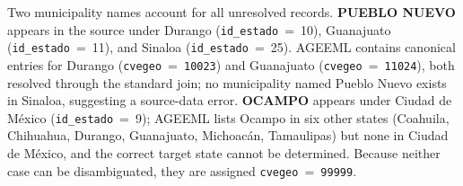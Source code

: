 \documentclass[3p]{elsarticle}
\begin{document}
  Two municipality names account for all unresolved records.                                                                                                                                  
  \textbf{PUEBLO NUEVO} appears in the source under Durango
  (\texttt{id\_estado}~=~10), Guanajuato                                                                                                                                                      
  (\texttt{id\_estado}~=~11), and Sinaloa                   
  (\texttt{id\_estado}~=~25).
  AGEEML contains canonical entries for Durango                                                                                                                                               
  (\texttt{cvegeo}~=~\texttt{10023}) and Guanajuato
  (\texttt{cvegeo}~=~\texttt{11024}), both resolved through                                                                                                                                   
  the standard join; no municipality named Pueblo Nuevo exists                                                                                                                                
  in Sinaloa, suggesting a source-data error.
  \textbf{OCAMPO} appears under Ciudad de M\'{e}xico                                                                                                                                          
  (\texttt{id\_estado}~=~9); AGEEML lists Ocampo in six                                                                                                                                       
  other states (Coahuila, Chihuahua, Durango, Guanajuato,                                                                                                                                     
  Michoac\'{a}n, Tamaulipas) but none in Ciudad de M\'{e}xico,                                                                                                                                
  and the correct target state cannot be determined.                                                                                                                                          
  Because neither case can be disambiguated, they are assigned                                                                                                                                
  \texttt{cvegeo}~=~\texttt{99999}.                                                                                                                                                           
                                                            
\end{document}
